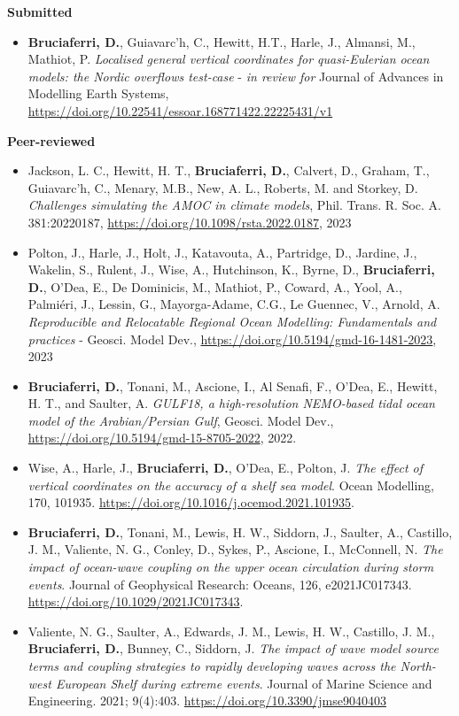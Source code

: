 \documentclass[a4paper, oneside, final]{scrartcl}
\begin{document}
\textbf{Submitted}
\begin{itemize}
\item \textbf{Bruciaferri, D.}, Guiavarc'h, C., Hewitt, H.T., Harle, J., Almansi, M., Mathiot, P. \textit{Localised general vertical coordinates for quasi-Eulerian ocean models: the Nordic overflows test-case} - \textit{in review for} Journal of Advances in Modelling Earth Systems, \url{https://doi.org/10.22541/essoar.168771422.22225431/v1}	
\end{itemize}	
\noindent
\textbf{Peer-reviewed}
\begin{itemize}
\item Jackson, L. C., Hewitt, H. T., \textbf{Bruciaferri, D.}, Calvert, D., Graham, T., Guiavarc’h, C., Menary, M.B., New, A. L., Roberts, M. and Storkey, D. \textit{Challenges simulating the AMOC in climate models}, Phil. Trans. R. Soc. A. 381:20220187, \url{https://doi.org/10.1098/rsta.2022.0187}, 2023	
\item Polton, J., Harle, J., Holt, J., Katavouta, A., Partridge, D., Jardine, J., Wakelin, S., Rulent, J., Wise, A., Hutchinson, K., Byrne, D., \textbf{Bruciaferri, D.}, O'Dea, E., De Dominicis, M., Mathiot, P., Coward, A., Yool, A., Palmiéri, J., Lessin, G., Mayorga-Adame, C.G., Le Guennec, V., Arnold, A. \textit{Reproducible and Relocatable Regional Ocean Modelling: Fundamentals and practices} - Geosci. Model Dev., \url{https://doi.org/10.5194/gmd-16-1481-2023}, 2023
\item \textbf{Bruciaferri, D.}, Tonani, M., Ascione, I., Al Senafi, F., O'Dea, E., Hewitt, H. T., and Saulter, A. \textit{GULF18, a high-resolution NEMO-based tidal ocean model of the Arabian/Persian Gulf}, Geosci. Model Dev., \url{https://doi.org/10.5194/gmd-15-8705-2022}, 2022.
\item Wise, A., Harle, J., \textbf{Bruciaferri, D.}, O'Dea, E., Polton, J. \textit{The effect of vertical coordinates on the accuracy of a shelf sea model}. Ocean Modelling, 170, 101935. \url{https://doi.org/10.1016/j.ocemod.2021.101935}.	
\item \textbf{Bruciaferri, D.}, Tonani, M., Lewis, H. W., Siddorn, J., Saulter, A., Castillo, J. M., Valiente, N. G., Conley, D., Sykes, P., Ascione, I., McConnell, N. \textit{The impact of ocean-wave coupling on the upper ocean circulation during storm events}. Journal of Geophysical Research: Oceans, 126, e2021JC017343. \url{https://doi.org/10.1029/2021JC017343}.
\item Valiente, N. G., Saulter, A., Edwards, J. M., Lewis, H. W., Castillo, J. M., \textbf{Bruciaferri, D.}, Bunney, C., Siddorn, J. \textit{The impact of wave model source terms and coupling strategies to rapidly developing waves across the North-west European Shelf during extreme events}. Journal of Marine Science and Engineering. 2021; 9(4):403. \url{https://doi.org/10.3390/jmse9040403}	

\end{itemize}
\end{document}
